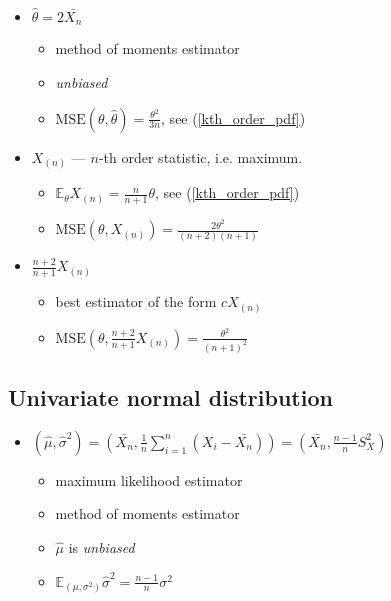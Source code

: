 \documentclass[12pt]{article}
\theoremstyle{definition}
\theoremstyle{remark}
\numberwithin{equation}{section}
\begin{document}
\begin{itemize}
	\item $\hat\theta = 2\bar{X_n}$
	\begin{itemize}
		\item method of moments estimator
		\item \emph{unbiased}
		\item $\text{MSE}(\theta, \hat\theta) = \frac {\theta^2}{3n}$, see (\ref{kth_order_pdf})
	\end{itemize}
	\item $X_{(n)}$ --- $n$-th order statistic, i.e. maximum.
	\begin{itemize}
		\item $\mathbb{E}_\theta X_{(n)} = \frac{n}{n+1}\theta$, see (\ref{kth_order_pdf})
		\item $\text{MSE}(\theta, X_{(n)}) = \frac {2\theta^2}{(n+2)(n+1)}$
	\end{itemize}
	\item $\frac{n+2}{n+1}X_{(n)}$
	\begin{itemize}
		\item best estimator of the form $cX_{(n)}$
		\item $\text{MSE}(\theta, \frac{n+2}{n+1}X_{(n)}) = \frac {\theta^2}{(n+1)^2}$
	\end{itemize}
\end{itemize}

\subsection{Univariate normal distribution}

\begin{itemize}
	\item $\displaystyle{(\hat\mu, \hat{\sigma}^2) = \left(\bar{X_n}, \frac 1 n \sum_{i=1}^n (X_i - \bar{X_n}) \right) = \left(\bar{X_n}, \frac {n-1} n S_X^2 \right)}$
	\begin{itemize}
		\item maximum likelihood estimator
		\item method of moments estimator
		\item $\hat\mu$ is \emph{unbiased}
		\item $\mathbb{E}_{(\mu,\sigma^2)}\hat{\sigma}^2 = \frac {n-1} n \sigma^2$

	\end{itemize}

\end{itemize}
\end{document}
